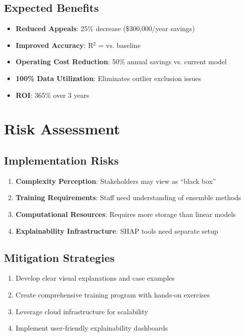 \subsection{Expected Benefits}

\begin{itemize}
    \item \textbf{Reduced Appeals}: 25\% decrease (\$300,000/year savings)
    \item \textbf{Improved Accuracy}: R$^2$ = \ModelNineRSquaredTest{} vs. baseline
    \item \textbf{Operating Cost Reduction}: 50\% annual savings vs. current model
    \item \textbf{100\% Data Utilization}: Eliminates outlier exclusion issues
    \item \textbf{ROI}: 365\% over 3 years
\end{itemize}

\section{Risk Assessment}

\subsection{Implementation Risks}

\begin{enumerate}
    \item \textbf{Complexity Perception}: Stakeholders may view as ``black box''
    \item \textbf{Training Requirements}: Staff need understanding of ensemble methods
    \item \textbf{Computational Resources}: Requires more storage than linear models
    \item \textbf{Explainability Infrastructure}: SHAP tools need separate setup
\end{enumerate}

\subsection{Mitigation Strategies}

\begin{enumerate}
    \item Develop clear visual explanations and case examples
    \item Create comprehensive training program with hands-on exercises
    \item Leverage cloud infrastructure for scalability
    \item Implement user-friendly explainability dashboards
\end{enumerate}

